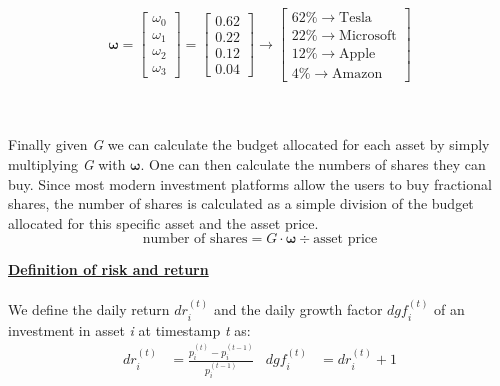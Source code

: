 \documentclass[12pt,a4paper]{report}
\begin{document}
\begin{minipage}{0.4\textwidth}
\end{minipage}%
\begin{minipage}{0.6\textwidth}
  \[
  \mathbf{\omega} = \begin{bmatrix} \omega_0 \\ \omega_1 \\ \omega_2 \\ \omega_3 \end{bmatrix} = \begin{bmatrix} 0.62 \\ 0.22 \\ 0.12 \\ 0.04 \end{bmatrix} \rightarrow \begin{bmatrix} 62\% \rightarrow \text{Tesla} \\ 22\% \rightarrow \text{Microsoft} \\ 12\% \rightarrow \text{Apple} \\ 4\% \rightarrow \text{Amazon} \end{bmatrix}
  \]
\end{minipage}
\\~\\

\noindent
Finally given \textit{G} we can calculate the budget allocated for each asset by simply multiplying \textit{G} with $\bm{\omega}$. One can then calculate the numbers of shares they can buy. Since most modern investment platforms allow the users to buy fractional shares, the number of shares is calculated as a simple division of the budget allocated for this specific asset and the asset price.
\[
\text{number of shares} = G \cdot \bm{\omega} \div \text{asset price}
\]

\newpage

\noindent
\textbf{\underline{Definition of risk and return}}
\\~\\
We define the daily return \(dr_i^{(t)}\) and the daily growth factor \(dgf_i^{(t)}\) of an investment in asset \textit{i} at timestamp \textit{t} as:
\begin{align*}
dr_i^{(t)} &= \frac{p_i^{(t)} - p_i^{(t-1)}}{p_i^{(t-1)}} & dgf_i^{(t)} &= dr_i^{(t)} + 1
\end{align*}
\end{document}
